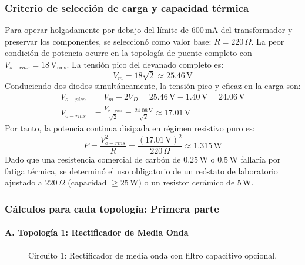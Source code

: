 \subsubsection{Criterio de selección de carga y capacidad térmica}
Para operar holgadamente por debajo del límite de $600\,\mathrm{mA}$ del transformador y preservar los componentes, se seleccionó como valor base: \textbf{$R = 220\,\Omega$}.
La peor condición de potencia ocurre en la topología de puente completo con $V_{s-rms} = 18\,\mathrm{V_{rms}}$. La tensión pico del devanado completo es:
\begin{equation}
    V_m = 18\sqrt{2} \approx 25.46\,\mathrm{V}
\end{equation}
Conduciendo dos diodos simultáneamente, la tensión pico y eficaz en la carga son:
\begin{align}
    V_{o-pico} &= V_m - 2V_D = 25.46\,\mathrm{V} - 1.40\,\mathrm{V} = 24.06\,\mathrm{V} \\
    V_{o-rms} &= \frac{V_{o-pico}}{\sqrt{2}} = \frac{24.06\,\mathrm{V}}{\sqrt{2}} \approx 17.01\,\mathrm{V}
\end{align}
Por tanto, la potencia continua disipada en régimen resistivo puro es:
\begin{equation}
    P = \frac{V_{o-rms}^2}{R} = \frac{(17.01\,\mathrm{V})^2}{220\,\Omega} \approx 1.315\,\mathrm{W}
\end{equation}
Dado que una resistencia comercial de carbón de $0.25\,\mathrm{W}$ o $0.5\,\mathrm{W}$ fallaría por fatiga térmica, se determinó el uso obligatorio de un reóstato de laboratorio ajustado a $220\,\Omega$ (capacidad $\ge 25\,\mathrm{W}$) o un resistor cerámico de $5\,\mathrm{W}$.

\subsubsection{Cálculos para cada topología: Primera parte}

\paragraph{A. Topología 1: Rectificador de Media Onda}

\begin{figure}[H]
\centering
\renewcommand{\etqFuente}{v_s(t)\ (9\,\mathrm{V_{rms}})}
\renewcommand{\etqCarga}{R\,(220\,\Omega)}

\caption{Circuito 1: Rectificador de media onda con filtro capacitivo opcional.}
\label{fig:media_onda}
\end{figure}

